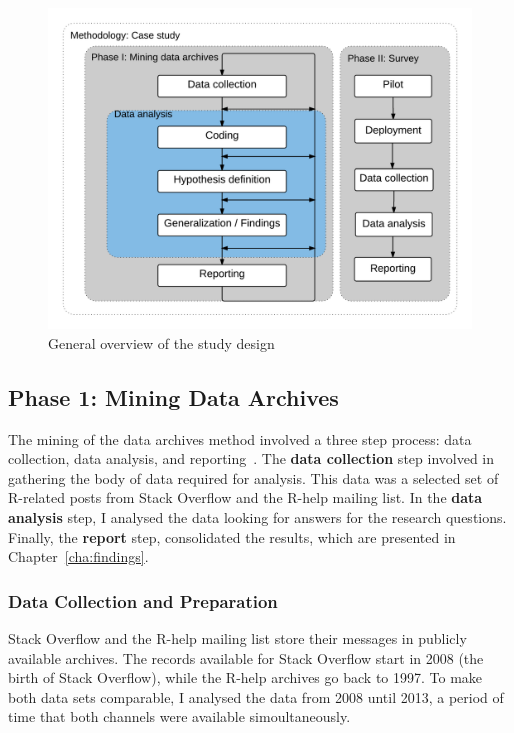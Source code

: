 \documentclass{sig-alternate-05-2015}
\begin{document}
	\begin{figure} [!ht]
		\centering
		\includegraphics[width=0.9\columnwidth]{Figures/StudyPhases}
		\caption{General overview of the study design}
		\label{fig:StudyPhases}
	\end{figure}

\subsection{Phase 1: Mining Data Archives} 
\label{sec:studyDesign}

	The mining of the data archives method involved a three step process: data collection, data analysis, and reporting~\cite{Runeson2012}.
	The \textbf{data collection} step involved in gathering the body of data required for analysis. 
	This data was a selected set of R-related posts from Stack Overflow and the R-help mailing list.
	In the \textbf{data analysis} step, I analysed the data looking for answers for the research questions.
	Finally, the \textbf{report} step, consolidated the results, which are presented in Chapter~\ref{cha:findings}.

\subsubsection{Data Collection and Preparation}
\label{subsec:preparation}

	Stack Overflow and the R-help mailing list store their messages in publicly available archives.
	The records available for Stack Overflow start in 2008 (the birth of Stack Overflow), while the R-help archives go back to 1997.
	To make both data sets comparable, I analysed the data from 2008 until 2013, a period of time that both channels were available simoultaneously.
\end{document}
